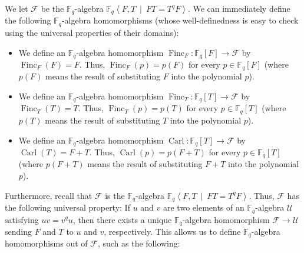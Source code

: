 \documentclass[numbers=enddot,12pt,final,onecolumn,notitlepage]{scrartcl}%
\theoremstyle{definition}
\begin{document}
We let $\mathcal{F}$ be the $\mathbb{F}_{q}$-algebra $\mathbb{F}%
_{q}\left\langle F,T\ \mid\ FT=T^{q}F\right\rangle $. We can immediately
define the following $\mathbb{F}_{q}$-algebra homomorphisms (whose
well-definedness is easy to check using the universal properties of their domains):

\begin{itemize}
\item We define an $\mathbb{F}_{q}$-algebra homomorphism $\operatorname*{Finc}%
\nolimits_{F}:\mathbb{F}_{q}\left[  F\right]  \rightarrow\mathcal{F}$ by
$\operatorname*{Finc}\nolimits_{F}\left(  F\right)  =F$. Thus,
$\operatorname*{Finc}\nolimits_{F}\left(  p\right)  =p\left(  F\right)  $ for
every $p\in\mathbb{F}_{q}\left[  F\right]  $ (where $p\left(  F\right)  $
means the result of substituting $F$ into the polynomial $p$).

\item We define an $\mathbb{F}_{q}$-algebra homomorphism $\operatorname*{Finc}%
\nolimits_{T}:\mathbb{F}_{q}\left[  T\right]  \rightarrow\mathcal{F}$ by
$\operatorname*{Finc}\nolimits_{T}\left(  T\right)  =T$. Thus,
$\operatorname*{Finc}\nolimits_{T}\left(  p\right)  =p\left(  T\right)  $ for
every $p\in\mathbb{F}_{q}\left[  T\right]  $ (where $p\left(  T\right)  $
means the result of substituting $T$ into the polynomial $p$).

\item We define an $\mathbb{F}_{q}$-algebra homomorphism $\operatorname*{Carl}%
:\mathbb{F}_{q}\left[  T\right]  \rightarrow\mathcal{F}$ by
$\operatorname*{Carl}\left(  T\right)  =F+T$. Thus, $\operatorname*{Carl}%
\left(  p\right)  =p\left(  F+T\right)  $ for every $p\in\mathbb{F}_{q}\left[
T\right]  $ (where $p\left(  F+T\right)  $ means the result of substituting
$F+T$ into the polynomial $p$).
\end{itemize}

Furthermore, recall that $\mathcal{F}$ is the $\mathbb{F}_{q}$-algebra
$\mathbb{F}_{q}\left\langle F,T\ \mid\ FT=T^{q}F\right\rangle $. Thus,
$\mathcal{F}$ has the following universal property: If $u$ and $v$ are two
elements of an $\mathbb{F}_{q}$-algebra $\mathcal{U}$ satisfying $uv=v^{q}u$,
then there exists a unique $\mathbb{F}_{q}$-algebra homomorphism
$\mathcal{F}\rightarrow\mathcal{U}$ sending $F$ and $T$ to $u$ and $v$,
respectively. This allows us to define $\mathbb{F}_{q}$-algebra homomorphisms
out of $\mathcal{F}$, such as the following:
\end{document}
